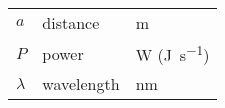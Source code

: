 \documentclass[fleqn]{fcup-thesis}
\begin{document}
\begin{preliminary}
		\begin{symbols}
				\begin{longtable}{lll}
					
					$a$ & distance & \si{\meter} \\
					$P$ & power & \si{\watt} (\si{\joule\per\second}) \\
					
					\addlinespace %
					
					$\lambda$ & wavelength & \si{\nano\meter} \\
				\end{longtable}
		\end{symbols}
		
	\end{preliminary}
	
	
	
	
		
	
	
	
    
	
	
	\appendix
		
	
	
	
	
	
	
	\nocite{} %
	
	
\end{document}
